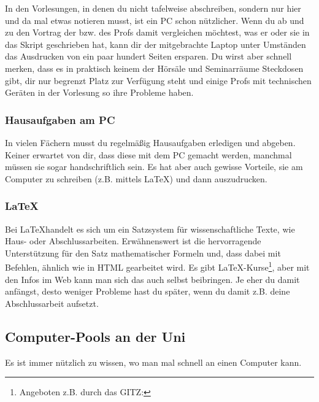 			In den Vorlesungen, in denen du nicht tafelweise abschreiben, sondern nur hier und da mal etwas notieren musst, ist ein PC schon nützlicher. Wenn du ab und zu den Vortrag der bzw. des Profs damit vergleichen möchtest, was er oder sie in das Skript geschrieben hat, kann dir der mitgebrachte Laptop unter Umständen das Ausdrucken von ein paar hundert Seiten ersparen. Du wirst aber schnell merken, dass es in praktisch keinem der Hörsäle und Seminarräume Steckdosen gibt, dir nur begrenzt Platz zur Verfügung steht und einige Profs mit technischen Geräten in der Vorlesung so ihre Probleme haben.

		\subsubsection{Hausaufgaben am PC}
			In vielen Fächern musst du regelmäßig Hausaufgaben erledigen und abgeben. Keiner erwartet von dir, dass diese mit dem PC gemacht werden, manchmal müssen sie sogar handschriftlich sein. Es hat aber auch gewisse Vorteile, sie am Computer zu schreiben (z.B. mittels \LaTeX) und dann auszudrucken.

		\subsubsection{\LaTeX}
			Bei \LaTeX handelt es sich um ein Satzsystem für wissenschaftliche Texte, wie Haus- oder Abschlussarbeiten. Erwähnenswert ist die hervorragende Unterstützung für den Satz mathematischer Formeln und, dass dabei mit Befehlen, ähnlich wie in HTML gearbeitet wird. Es gibt \LaTeX-Kurse\footnote{Angeboten z.B. durch das GITZ: },
			 aber mit den Infos im Web kann man sich das auch selbst beibringen. Je eher du damit anfängst, desto weniger Probleme hast du später, wenn du damit z.B. deine Abschlussarbeit aufsetzt.

		\subsection{Computer-Pools an der Uni}
			Es ist immer nützlich zu wissen, wo man mal schnell an einen Computer kann.

